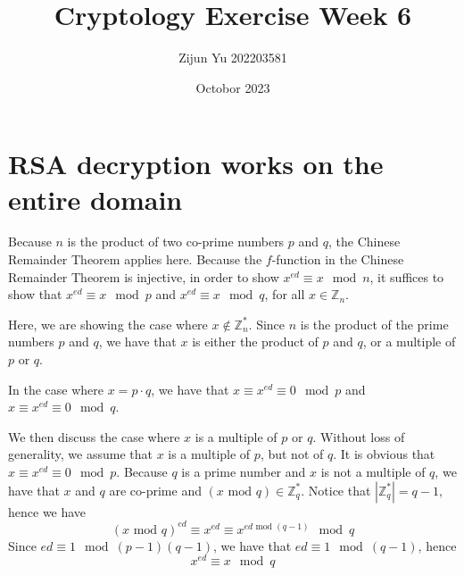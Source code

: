 \documentclass{article}
\title{Cryptology Exercise Week 6}
\author{Zijun Yu 202203581}
\date{Octobor 2023}
\begin{document}
\maketitle

\section*{RSA decryption works on the entire domain}

Because $n$ is the product of two co-prime numbers $p$ and $q$,
the Chinese Remainder Theorem applies here. Because the $f$-function
in the Chinese Remainder Theorem is injective, in order to show
$x^{ed} \equiv x \mod n$, it suffices to show
that $x^{ed} \equiv x \mod p$ and $x^{ed} \equiv x \mod q$, for all $x \in  \mathbb{Z}_n$.

Here, we are showing the case where $x \notin \mathbb{Z}_n^*$. Since $n$ is the
product of the prime numbers $p$ and $q$, we have that $x$ is either
the product of $p$ and $q$, or a multiple of $p$ or $q$.

In the case where $x = p \cdot q$, we have that $x \equiv x^{ed} \equiv 0 \mod p$ and
$x \equiv x^{ed} \equiv 0 \mod q$.

We then discuss the case where $x$ is a multiple of $p$ or $q$. Without loss of generality,
we assume that $x$ is a multiple of $p$, but not of $q$.
It is obvious that $x \equiv x^{ed} \equiv 0 \mod p$.
Because $q$ is a prime number and $x$ is not a multiple of $q$, we have that
$x$ and $q$ are co-prime and $(x \text{ mod } q) \in \mathbb{Z}_q^*$. Notice that
$|\mathbb{Z}_q^*| = q-1$, hence we have
$$ (x \text{ mod } q)^{ed} \equiv x^{ed} \equiv x^{ed \text{ mod } (q-1)} \mod q$$
Since $ed \equiv 1 \mod (p-1)(q-1)$, we have that $ed \equiv 1 \mod (q-1)$, hence
$$ x^{ed} \equiv x \mod q$$
\end{document}
